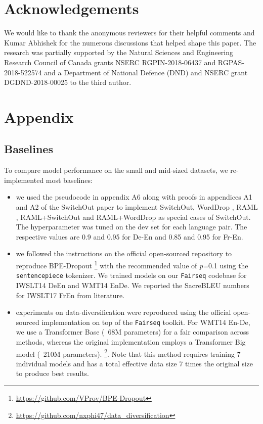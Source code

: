 \documentclass[11pt]{article}
\begin{document}
\section*{Acknowledgements}
We would like to thank the anonymous reviewers for their helpful comments
and Kumar Abhishek for the numerous discussions that helped shape this paper. The research was partially supported by the Natural Sciences and Engineering Research Council of Canada grants NSERC RGPIN-2018-06437 and RGPAS-2018-522574 and a Department of National Defence (DND) and NSERC grant DGDND-2018-00025 to the third author.




\clearpage
\appendix

\section{Appendix}
\label{sec:appendix}

\subsection{Baselines}\label{sec:baselines}

To compare model performance on the small and mid-sized datasets, we re-implemented most baselines:
\begin{itemize}
    \item we used the pseudocode in appendix A6 along with proofs in appendices A1 and A2 of the SwitchOut paper \cite{wang-etal-2018-switchout} to implement SwitchOut, WordDrop \cite{sennrich-etal-2016-edinburgh}, RAML \cite{Norouzi2016RewardAM}, RAML+SwitchOut and RAML+WordDrop as special cases of SwitchOut. The hyperparameter  was tuned on the dev set for each language pair. The respective  values are 0.9 and 0.95 for De-En and 0.85 and 0.95 for Fr-En.
    
    \item we followed the instructions on the official open-sourced repository to reproduce BPE-Dropout \cite{provilkov2020bpe} \footnote{\url{https://github.com/VProv/BPE-Dropout}} with the recommended value of \emph{p=}0.1 using the \texttt{sentencepiece} tokenizer. We trained models on our \texttt{Fairseq} codebase for IWSLT14 DeEn and WMT14 EnDe. We reported the SacreBLEU numbers for IWSLT17 FrEn from literature.
    
    \item experiments on data-diversification \cite{nguyen19datadiverse} were reproduced using the official open-sourced implementation on top of the \texttt{Fairseq} toolkit. For WMT14 En-De, we use a Transformer Base (~68M parameters) for a fair comparison across methods, whereas the original implementation employs a Transformer Big model (~210M parameters). \footnote{\url{https://github.com/nxphi47/data\_diversification}}. Note that this method requires training 7 individual models and has a total effective data size 7 times the original size to produce best results. 
\end{itemize}
\end{document}
